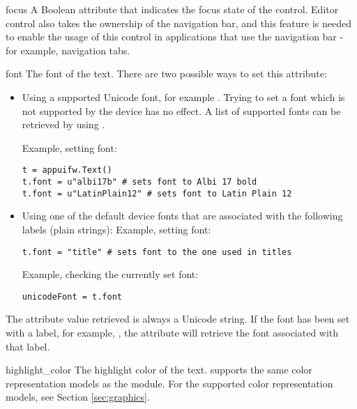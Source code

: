 \begin{memberdesc}[Text]{focus}
A Boolean attribute that indicates the focus state of the control. Editor 
control also takes the ownership of the navigation bar, and this feature is 
needed to enable the usage of this control in applications that use the 
navigation bar - for example, navigation tabs.
\end{memberdesc}

\begin{memberdesc}[Text]{font} 
The font of the text. There are two possible ways to set this attribute:

\begin{itemize}

\item Using a supported Unicode font, for example . Trying to set a font which is not supported by the device has no effect. A list of supported fonts can be retrieved by using .

Example, setting font:
\begin{verbatim}
t = appuifw.Text()
t.font = u"albi17b" # sets font to Albi 17 bold
t.font = u"LatinPlain12" # sets font to Latin Plain 12
\end{verbatim}
\item Using one of the default device fonts that are associated with the following labels (plain strings):
Example, setting font: 
\begin{verbatim}
t.font = "title" # sets font to the one used in titles
\end{verbatim}

Example, checking the currently set font: 
\begin{verbatim}
unicodeFont = t.font
\end{verbatim}
\end{itemize}

The attribute value retrieved is always a Unicode string. If the font has 
been set with a label, for example, , the attribute will 
retrieve the font associated with that label. 
\end{memberdesc}

\begin{memberdesc}[Text]{highlight_color}
The highlight color of the text.  supports the 
same color representation models as the  module. For the 
supported color representation models, see Section \ref{sec:graphics}.
\end{memberdesc}

